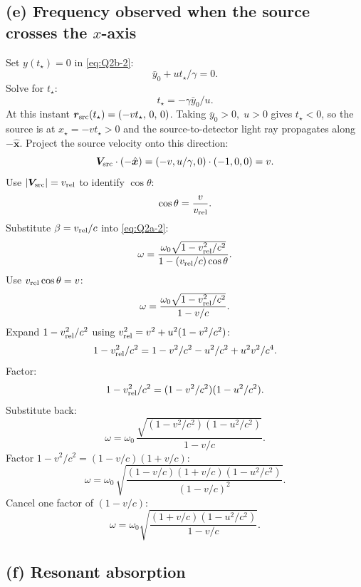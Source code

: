 \documentclass[11pt]{article}
\begin{document}
\subsection*{(e) Frequency observed when the source crosses the $x$-axis}

Set $y(t_\star)=0$ in \eqref{eq:Q2b-2}:
\[ \bar y_0 + ut_\star/\gamma = 0. \]
Solve for $t_\star$:
\[ t_\star = -\gamma\bar y_0/u. \]
At this instant $\bm r_{\rm src}(t_\star) = (-v t_\star,\,0,\,0)$. Taking $\bar y_0>0,\;u>0$ gives $t_\star<0$, so the source is at $x_\star=-v t_\star>0$ and the source-to-detector light ray propagates along $-\hat{\bm x}$. Project the source velocity onto this direction:
\[ \bm V_{\rm src}\cdot(-\hat{\bm x}) = (-v,u/\gamma,0)\cdot(-1,0,0) = v. \]
Use $|\bm V_{\rm src}|=v_{\rm rel}$ to identify $\cos\theta$:
\[ \cos\theta = \frac{v}{v_{\rm rel}}. \]
Substitute $\beta = v_{\rm rel}/c$ into \eqref{eq:Q2a-2}:
\[ \omega = \frac{\omega_0\sqrt{1-v_{\rm rel}^2/c^2}}{1-(v_{\rm rel}/c)\cos\theta}. \]
Use $v_{\rm rel}\cos\theta = v$:
\[ \omega = \frac{\omega_0\sqrt{1-v_{\rm rel}^2/c^2}}{1-v/c}. \]
Expand $1-v_{\rm rel}^2/c^2$ using $v_{\rm rel}^2 = v^2 + u^2(1-v^2/c^2)$:
\[ 1-v_{\rm rel}^2/c^2 = 1 - v^2/c^2 - u^2/c^2 + u^2 v^2/c^4. \]
Factor:
\[ 1-v_{\rm rel}^2/c^2 = (1-v^2/c^2)(1-u^2/c^2). \]
Substitute back:
\[ \omega = \omega_0\,\frac{\sqrt{(1-v^2/c^2)(1-u^2/c^2)}}{1-v/c}. \]
Factor $1-v^2/c^2=(1-v/c)(1+v/c)$:
\[ \omega = \omega_0\,\sqrt{\frac{(1-v/c)(1+v/c)(1-u^2/c^2)}{(1-v/c)^2}}. \]
Cancel one factor of $(1-v/c)$:
\begin{equation}
\boxed{\omega = \omega_0\sqrt{\frac{(1+v/c)(1-u^2/c^2)}{1-v/c}}.}
\label{eq:Q2e-4}
\end{equation}

\subsection*{(f) Resonant absorption}
\end{document}
